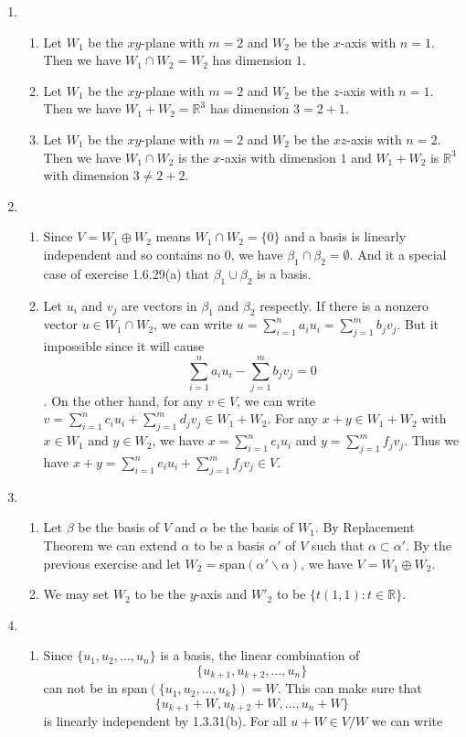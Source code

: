 \begin{enumerate}
\begin{enumerate}
\end{enumerate}
\item \begin{enumerate}
\item Let $W_1$ be the $xy$-plane with $m=2$ and $W_2$ be the $x$-axis with $n=1$. Then we have $W_1\cap W_2=W_2$ has dimension $1$.
\item Let $W_1$ be the $xy$-plane with $m=2$ and $W_2$ be the $z$-axis with $n=1$. Then we have $W_1+W_2=\mathbb{R}^3$ has dimension $3=2+1$.
\item Let $W_1$ be the $xy$-plane with $m=2$ and $W_2$ be the $xz$-axis with $n=2$. Then we have $W_1\cap W_2$ is the $x$-axis with dimension $1$ and $W_1+W_2$ is $\mathbb{R}^3$ with dimension $3\neq 2+2$.
\end{enumerate}
\item \begin{enumerate}
\item Since $V=W_1\oplus W_2$ means $W_1\cap W_2=\{0\}$ and a basis is linearly independent and so contains no $0$, we have $\beta _1\cap\beta_2=\emptyset$. And it a special case of exercise 1.6.29(a) that $\beta _1\cup\beta_2$ is a basis. 
\item Let $u_i$ and $v_j$ are vectors in $\beta_1$ and $\beta_2$ respectly. If there is a nonzero vector $u\in W_1\cap W_2$, we can write $u=\sum_{i=1}^n{a_iu_i}=\sum_{j=1}^m{b_jv_j}$. But it impossible since it will cause \[\sum_{i=1}^n{a_iu_i}-\sum_{j=1}^m{b_jv_j}=0\]. On the other hand, for any $v\in V$, we can write $v=\sum_{i=1}^n{c_iu_i}+\sum_{j=1}^m{d_jv_j}\in W_1+W_2$. For any $x+y\in W_1+W_2$ with $x\in W_1$ and $y\in W_2$, we have $x=\sum_{i=1}^n{e_iu_i}$ and $y=\sum_{j=1}^m{f_jv_j}$. Thus we have $x+y=\sum_{i=1}^n{e_iu_i}+\sum_{j=1}^m{f_jv_j}\in V$.
\end{enumerate}
\item \begin{enumerate}
\item Let $\beta $ be the basis of $V$ and $\alpha $ be the basis of $W_1$. By Replacement Theorem we can extend $\alpha $ to be a basis $\alpha '$ of $V$ such that $\alpha \subset \alpha'$. By the previous exercise and let $W_2=$span$(\alpha' \backslash \alpha )$, we have $V=W_1\oplus W_2$.
\item We may set $W_2$ to be the $y$-axis and $W'_2$ to be $\{t(1,1):t\in \mathbb{R}\}$.
\end{enumerate}
\item \begin{enumerate}
\item Since $\{u_1,u_2,\ldots ,u_n\}$ is a basis, the linear combination of \[\{u_{k+1},u_{k+2},\ldots ,u_n\}\] can not be in span$(\{u_1,u_2,\ldots ,u_k\})=W$. This can make sure that \[\{u_{k+1}+W, u_{k+2}+W, \ldots ,u_n+W\}\] is linearly independent by 1.3.31(b). For all $u+W\in V/W$ we can write 

\end{enumerate}
\end{enumerate}
